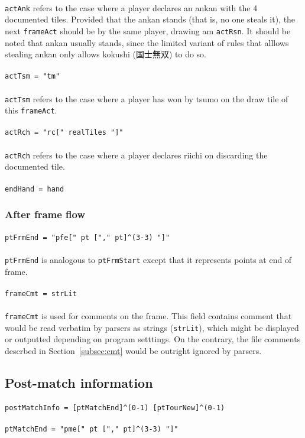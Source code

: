 \documentclass[%
	a4paper%
	,10pt%
	,twoside%
	,notitlepage%
]{article}%
\newcommand*{\ruleSymbol}{\textjapanese{⚠}}%
\newcommand*{\ruleMargin}{\marginpar{\flushright{}\ruleSymbol{}}}%
\newcommand*{\rulePar}{\paragraph*{\ruleMargin{}}}%
\begin{document}
			\paragraph*{}\lstinline/actAnk/ refers to the case where a player declares an ankan with the 4 documented tiles. Provided that the ankan stands (that is, no one steals it), the next \lstinline/frameAct/ should be by the same player, drawing am \lstinline/actRsn/. It should be noted that ankan usually stands, since the limited variant of rules that alllows stealing ankan only allows kokushi (\textjapanese{国士無双}) to do so. %
			\rulePar{}\lstinline/actTsm = "tm"/%
			\paragraph*{}\lstinline/actTsm/ refers to the case where a player has won by tsumo on the draw tile of this \lstinline/frameAct/. %
			\rulePar{}\lstinline/actRch = "rc[" realTiles "]"/%
			\paragraph*{}\lstinline/actRch/ refers to the case where a player declares riichi on discarding the documented tile. %
			\rulePar{}\lstinline/endHand = hand/%
		\subsubsection{After frame flow}\label{subsubsec:postfrmflow}%
			\rulePar{}\lstinline/ptFrmEnd = "pfe[" pt ["," pt]^(3-3) "]"/%
			\paragraph*{}\lstinline/ptFrmEnd/ is analogous to \lstinline/ptFrmStart/ except that it represents points at end of frame. %
			\rulePar{}\lstinline/frameCmt = strLit/%
			\paragraph*{}\lstinline/frameCmt/ is used for comments on the frame. This field contains comment that would be read verbatim by parsers as strings (\lstinline/strLit/), which might be displayed or outputted depending on program setttings. On the contrary, the file comments descrbed in Section~\ref{subsec:cmt} would be outright ignored by parsers. %
	\subsection{Post-match information}%
		\rulePar{}\lstinline/postMatchInfo = [ptMatchEnd]^(0-1) [ptTourNew]^(0-1)/%
		\rulePar{}\lstinline/ptMatchEnd = "pme[" pt ["," pt]^(3-3) "]"/%
\end{document}
